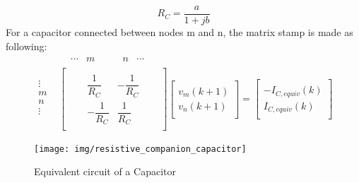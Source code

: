 \begin{equation}
	R_C = \frac{a}{1+jb}
\end{equation}
%
For a capacitor connected between nodes m and n, the matrix stamp is made as following:
%
\begin{equation}
\begin{split}
	&
	\begin{matrix}
		& \cdots & m & \quad \quad n & \cdots
	\end{matrix}\\[-6pt]
	\begin{matrix}
		\vdots\\[6pt]
		m\\[6pt]
		n\\[6pt]
		\vdots\\
	\end{matrix}
	&
	\begin{bmatrix}
		\quad & \quad & \\[6pt]
		\quad & \dfrac{1}{R_C} & -\dfrac{1}{R_C} & \quad \\[6pt]
		\quad & -\dfrac{1}{R_C} & \dfrac{1}{R_C} & \quad \\[6pt]
		\quad &  & 
	\end{bmatrix}
	\begin{bmatrix}
		\quad \\[6pt]
		v_m(k+1)\\[6pt]
		v_n(k+1)\\[6pt]
		\quad
	\end{bmatrix}
	=
	\begin{bmatrix}
		\quad \\[6pt]
		-I_{C,equiv}(k)\\[6pt]
		I_{C,equiv}(k)\\[6pt]
		\quad
	\end{bmatrix}
\end{split}
\end{equation}
%
\begin{figure}[ht]
	\centering
	\texttt{[image: img/resistive\_companion\_capacitor]} 
	\caption{Equivalent circuit of a Capacitor}
	\label{fig:Capacitor}
\end{figure}


